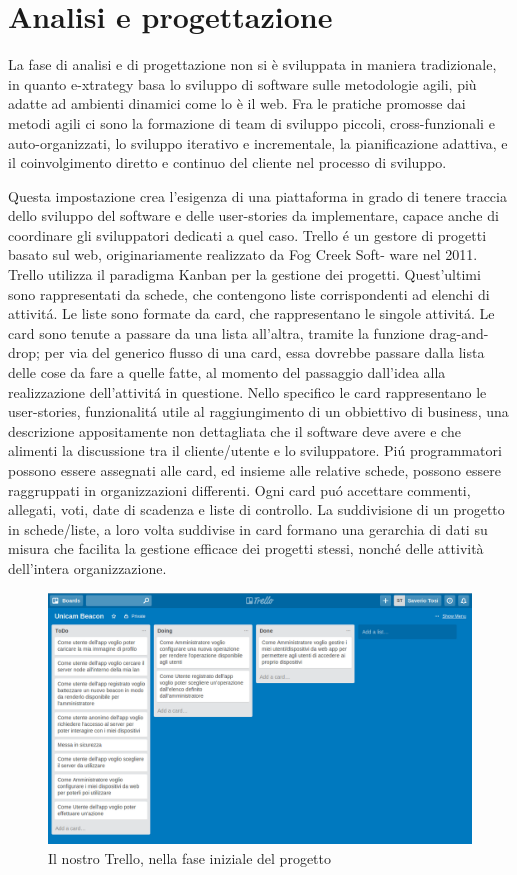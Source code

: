 \section{Analisi e progettazione}
La fase di analisi e di progettazione non si è sviluppata in maniera tradizionale, in quanto e-xtrategy basa lo sviluppo di software sulle metodologie agili, più adatte ad ambienti dinamici come lo è il web.
Fra le pratiche promosse dai metodi agili ci sono la formazione di team di sviluppo piccoli, cross-funzionali e auto-organizzati, 
lo sviluppo iterativo e incrementale, 
la pianificazione adattiva, 
e il coinvolgimento diretto e continuo del cliente nel processo di sviluppo.

Questa impostazione crea l’esigenza di una piattaforma in grado di tenere traccia dello sviluppo
del software e delle user-stories da implementare, capace anche di coordinare gli sviluppatori
dedicati a quel caso.
Trello\cite{trello} é un gestore di progetti basato sul web, originariamente realizzato da Fog Creek Soft-
ware nel 2011.
Trello utilizza il paradigma Kanban per la gestione dei progetti. Quest’ultimi sono rappresentati
da schede, che contengono liste corrispondenti ad elenchi di attivitá. Le liste sono formate da
card, che rappresentano le singole attivitá. Le card sono tenute a passare da una lista all’altra,
tramite la funzione drag-and-drop; per via del generico flusso di una card, essa dovrebbe passare
dalla lista delle cose da fare a quelle fatte, al momento del passaggio dall’idea alla realizzazione
dell’attivitá in questione.
Nello specifico le card rappresentano le user-stories, funzionalitá utile al raggiungimento di un
obbiettivo di business, una descrizione appositamente non dettagliata che il software deve avere
e che alimenti la discussione tra il cliente/utente e lo sviluppatore.
Piú programmatori possono essere assegnati alle card, ed insieme alle relative schede, possono
essere raggruppati in organizzazioni differenti. Ogni card puó accettare commenti, allegati, voti,
date di scadenza e liste di controllo.
La suddivisione di un progetto in schede/liste, a loro volta suddivise in card formano una
gerarchia di dati su misura che facilita la gestione efficace dei progetti stessi, nonché delle attività dell'intera organizzazione.
\begin{figure}[h]
\centering
\includegraphics[scale=0.35]{Immagini/trello.png} 
\caption{Il nostro Trello, nella fase iniziale del progetto}
\end{figure}

